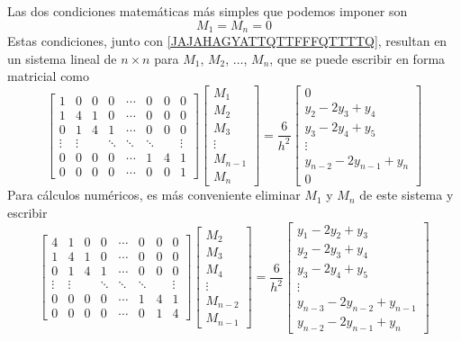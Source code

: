 Las dos condiciones matemáticas más simples que podemos imponer son
$$M_1 = M_n = 0$$
Estas condiciones, junto con \eqref{JAJAHAGYATTQTTFFFQTTTTQ}, resultan en un sistema lineal de $n \times n$ para $M_1$, $M_2$, $\dots$, $M_n$, que se puede escribir en forma matricial como
$$\begin{bmatrix}
    1 & 0 & 0 & 0 & \cdots & 0 & 0 & 0 \\
    1 & 4 & 1 & 0 & \cdots & 0 & 0 & 0 \\
    0 & 1 & 4 & 1 & \cdots & 0 & 0 & 0 \\
    \vdots & \vdots & & \ddots & \ddots & \ddots & & \vdots \\
    0 & 0 & 0 & 0 & \cdots & 1 & 4 & 1 \\
    0 & 0 & 0 & 0 & \cdots & 0 & 0 & 1
\end{bmatrix} \begin{bmatrix}
    M_1 \\
    M_2 \\
    M_3 \\
    \vdots \\
    M_{n-1} \\
    M_n
\end{bmatrix} = \frac{6}{h^2} \begin{bmatrix}
    0 \\
    y_2 - 2y_3 + y_4 \\
    y_3 - 2y_4 + y_5 \\
    \vdots \\
    y_{n-2} - 2y_{n-1} + y_n \\
    0
\end{bmatrix}$$
Para cálculos numéricos, es más conveniente eliminar $M_1$ y $M_n$ de este sistema y escribir
$$\begin{bmatrix}
    4 & 1 & 0 & 0 & \cdots & 0 & 0 & 0 \\
    1 & 4 & 1 & 0 & \cdots & 0 & 0 & 0 \\
    0 & 1 & 4 & 1 & \cdots & 0 & 0 & 0 \\
    \vdots & \vdots & & \ddots & \ddots & \ddots & & \vdots \\
    0 & 0 & 0 & 0 & \cdots & 1 & 4 & 1 \\
    0 & 0 & 0 & 0 & \cdots & 0 & 1 & 4
\end{bmatrix} \begin{bmatrix}
    M_2 \\
    M_3 \\
    M_4 \\
    \vdots \\
    M_{n-2} \\
    M_{n-1}
\end{bmatrix} = \frac{6}{h^2} \begin{bmatrix}
    y_1 - 2y_2 + y_3 \\
    y_2 - 2y_3 + y_4 \\
    y_3 - 2y_4 + y_5 \\
    \vdots \\
    y_{n-3} - 2y_{n-2} + y_{n-1} \\
    y_{n-2} - 2y_{n-1} + y_n
\end{bmatrix}$$
